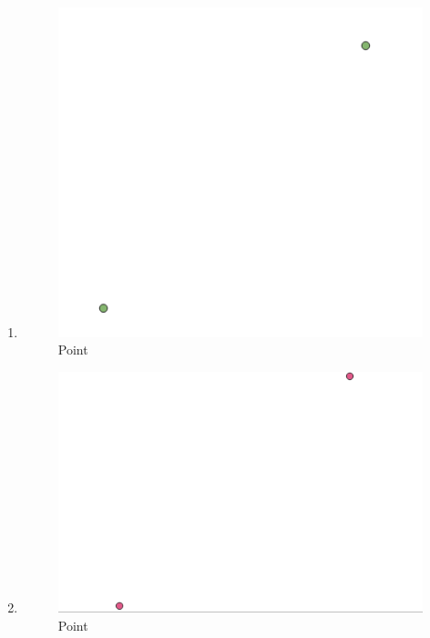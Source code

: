 \begin{enumerate}
	\item 
	
	\begin{figure}[H]
		\includegraphics[width=12cm]{figures/1174040/Python1/Soal3.PNG}
		\centering
		\caption{Point}
	\end{figure}
	
	\item 
	
	\begin{figure}[H]
		\includegraphics[width=12cm]{figures/1174040/Python1/Soal4.PNG}
		\centering
		\caption{Point}
	\end{figure}
	

\end{enumerate}
